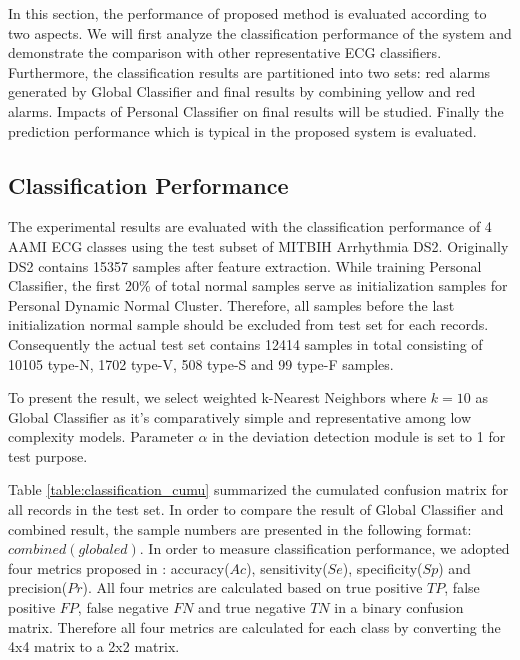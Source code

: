 In this section, the performance of proposed method is evaluated according to two aspects. We will first analyze the classification performance of the system and demonstrate the comparison with other representative ECG classifiers. Furthermore, the classification results are partitioned into two sets:   red alarms generated by Global Classifier and final results by combining yellow and red alarms. Impacts of Personal Classifier on final results will be studied. Finally the prediction performance which is typical in the proposed system is evaluated.

\subsection{Classification Performance}

The experimental results are evaluated with the classification performance of 4 AAMI ECG classes using the test subset of MITBIH Arrhythmia DS2. Originally DS2 contains 15357 samples after feature extraction. While training Personal Classifier, the first 20\% of total normal samples serve as initialization samples for Personal Dynamic Normal Cluster. Therefore, all samples before the last initialization normal sample should be excluded from test set for each records. Consequently  the actual test set contains 12414 samples in total consisting of 10105 type-N, 1702 type-V, 508 type-S and 99 type-F samples.

To present the result, we select weighted k-Nearest Neighbors where $k=10$ as Global Classifier as it's comparatively simple and representative among low complexity models. Parameter $\alpha$ in the deviation detection module is set to 1 for test purpose. 

Table \ref{table:classification_cumu} summarized the cumulated confusion matrix for all records in the test set. In order to compare the result of Global Classifier and combined result, the sample numbers are presented in the following format: $combined(globaled)$. In order to measure classification performance, we adopted four metrics proposed in \cite{Hu_et_al}: accuracy($Ac$), sensitivity($Se$), specificity($Sp$) and precision($Pr$). All four metrics are calculated based on true positive $TP$, false positive $FP$, false negative $FN$ and true negative $TN$ in a binary confusion matrix. Therefore all four metrics are calculated for each class by converting the 4x4 matrix to a 2x2 matrix.

